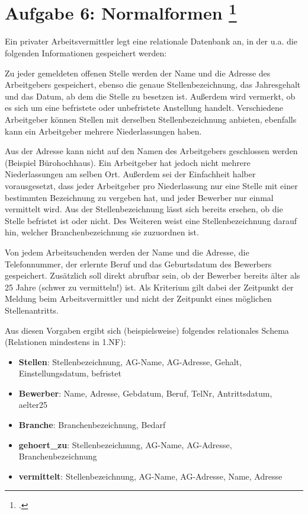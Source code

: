 \documentclass{lehramt-informatik-aufgabe}
\begin{document}

\section{Aufgabe 6: Normalformen
\footcite{db:ab:7}}

Ein privater Arbeitsvermittler legt eine relationale Datenbank an, in
der u.a. die folgenden Informationen gespeichert werden:

Zu jeder gemeldeten offenen Stelle werden der Name und die Adresse des
Arbeitgebers gespeichert, ebenso die genaue Stellenbezeichnung, das
Jahresgehalt und das Datum, ab dem die Stelle zu besetzen ist. Außerdem
wird vermerkt, ob es sich um eine befristete oder unbefristete
Anstellung handelt. Verschiedene Arbeitgeber können Stellen mit
derselben Stellenbezeichnung anbieten, ebenfalls kann ein Arbeitgeber
mehrere Niederlassungen haben.

Aus der Adresse kann nicht auf den Namen des Arbeitgebers geschlossen
werden (Beispiel Bürohochhaus). Ein Arbeitgeber hat jedoch nicht mehrere
Niederlassungen am selben Ort. Außerdem sei der Einfachheit halber
vorausgesetzt, dass jeder Arbeitgeber pro Niederlassung nur eine Stelle
mit einer bestimmten Bezeichnung zu vergeben hat, und jeder Bewerber nur
einmal vermittelt wird. Aus der Stellenbezeichnung lässt sich bereits
ersehen, ob die Stelle befristet ist oder nicht. Des Weiteren weist eine
Stellenbezeichnung darauf hin, welcher Branchenbezeichnung sie
zuzuordnen ist.

Von jedem Arbeitsuchenden werden der Name und die Adresse, die
Telefonnummer, der erlernte Beruf und das Geburtsdatum des Bewerbers
gespeichert. Zusätzlich soll direkt abrufbar sein, ob der Bewerber
bereits älter als 25 Jahre (schwer zu vermitteln!) ist. Als Kriterium
gilt dabei der Zeitpunkt der Meldung beim Arbeitsvermittler und nicht
der Zeitpunkt eines möglichen Stellenantritts.

Aus diesen Vorgaben ergibt sich (beispielsweise) folgendes relationales
Schema (Relationen mindestens in 1.NF):

\begin{itemize}
\item \textbf{Stellen}: Stellenbezeichnung, AG-Name, AG-Adresse, Gehalt,
Einstellungsdatum, befristet

\item \textbf{Bewerber}: Name, Adresse, Gebdatum, Beruf, TelNr,
Antrittsdatum, aelter25

\item \textbf{Branche}: Branchenbezeichnung, Bedarf

\item \textbf{gehoert\_zu}: Stellenbezeichnung, AG-Name, AG-Adresse,
Branchenbezeichnung

\item \textbf{vermittelt}: Stellenbezeichnung, AG-Name, AG-Adresse,
Name, Adresse
\end{itemize}
\end{document}

